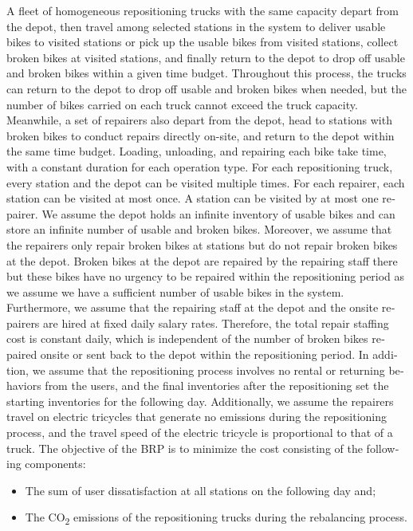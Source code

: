 \documentclass[
  english,
]{article}
\begin{document}
\begin{otherlanguage}{english}
\protect{}\label{p0155}
A fleet of homogeneous repositioning trucks with the same capacity depart from the depot, then
travel among selected stations in the system to deliver usable bikes to visited stations or pick up
the usable bikes from visited stations, collect broken bikes at visited stations, and finally return
to the depot to drop off usable and broken bikes within a given time budget. Throughout this
process, the trucks can return to the depot to drop off usable and broken bikes when needed, but the
number of bikes carried on each truck cannot exceed the truck capacity. Meanwhile, a set of
repairers also depart from the depot, head to stations with broken bikes to conduct repairs directly
on-site, and return to the depot within the same time budget. Loading, unloading, and repairing each
bike take time, with a constant duration for each operation type. For each repositioning truck,
every station and the depot can be visited multiple times. For each repairer, each station can be
visited at most once. A station can be visited by at most one repairer. We assume the depot holds an
infinite inventory of usable bikes and can store an infinite number of usable and broken bikes.
Moreover, we assume that the repairers only repair broken bikes at stations but do not repair broken
bikes at the depot. Broken bikes at the depot are repaired by the repairing staff there but these
bikes have no urgency to be repaired within the repositioning period as we assume we have a
sufficient number of usable bikes in the system. Furthermore, we assume that the repairing staff at
the depot and the onsite repairers are hired at fixed daily salary rates. Therefore, the total
repair staffing cost is constant daily, which is independent of the number of broken bikes repaired
onsite or sent back to the depot within the repositioning period. In addition, we assume that the
repositioning process involves no rental or returning behaviors from the users, and the final
inventories after the repositioning set the starting inventories for the following day.
Additionally, we assume the repairers travel on electric tricycles that generate no emissions during
the repositioning process, and the travel speed of the electric tricycle is proportional to that of
a truck. The objective of the BRP is to minimize the cost consisting of the following components:

\begin{itemize}
\item
  \protect{}\label{p0160}
  The sum of user dissatisfaction at all stations on the following day and;
\item
  \protect{}\label{p0165}
  The CO\textsubscript{2} emissions of the repositioning trucks during the rebalancing process.
\end{itemize}


\end{otherlanguage}
\end{document}
